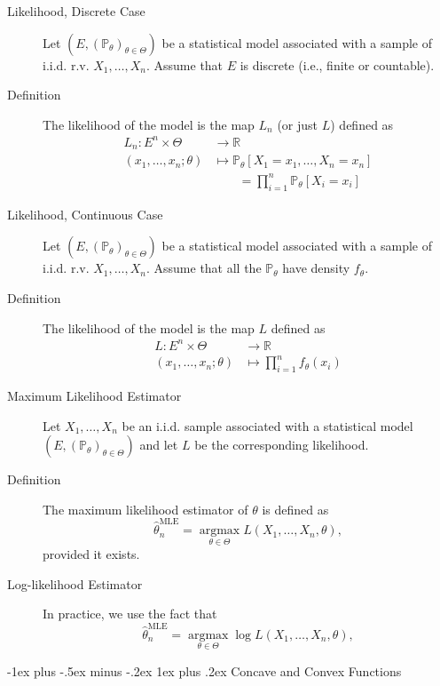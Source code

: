 \documentclass[a4paper, 10pt,landscape]{article}
\makeatletter
\DeclareMathOperator*{\argmax}{argmax}
\renewcommand{\subsubsection}{\@startsection{subsubsection}{3}{0mm}%
                                {-1ex plus -.5ex minus -.2ex}%
                                {1ex plus .2ex}%
                                {\normalfont\small\bfseries}}
\makeatother
\begin{document}
\begin{multicols*}{3}
\begin{description}
	\item[Likelihood, Discrete Case] Let $\left(E,\left(\mathbb{P}_\theta\right)_{\theta\in\Theta}\right)$ be a statistical model associated with a sample of i.i.d. r.v. $X_1,\dots,X_n$. Assume that $E$ is discrete (i.e., finite or countable).
	\item[Definition] The likelihood of the model is the map $L_n$ (or just $L$) defined as
	\begin{align*}
		L_n: E^n\times\Theta&\rightarrow\mathbb{R}\\
		(x_1,\dots,x_n;\theta)&\mapsto\mathbb{P}_\theta\left[X_1=x_1,\dots,X_n=x_n\right]\\
		&\qquad=\prod_{i=1}^{n}\mathbb{P}_\theta\left[X_i=x_i\right]
	\end{align*}
	\item[Likelihood, Continuous Case] Let $\left(E,\left(\mathbb{P}_\theta\right)_{\theta\in\Theta}\right)$ be a statistical model associated with a sample of i.i.d. r.v. $X_1,\dots,X_n$. Assume that all the $\mathbb{P}_\theta$ have density $f_\theta$.
	\item[Definition] The likelihood of the model is the map $L$ defined as
	\begin{align*}
	L: E^n\times\Theta&\rightarrow\mathbb{R}\\
	(x_1,\dots,x_n;\theta)&\mapsto\prod_{i=1}^{n}f_\theta(x_i)
	\end{align*}
	\item[Maximum Likelihood Estimator] Let $X_1,\dots,X_n$ be an i.i.d. sample associated with a statistical model $\left(E,\left(\mathbb{P}_\theta\right)_{\theta\in\Theta}\right)$ and let $L$ be the corresponding likelihood.
	\item[Definition] The maximum likelihood estimator of $\theta$ is defined as
	$$\hat{\theta}_n^\text{MLE}=\argmax\limits_{\theta\in\Theta}L\left(X_1,\dots,X_n,\theta\right),$$
	provided it exists.
	\item[Log-likelihood Estimator] In practice, we use the fact that
	$$\hat{\theta}_n^\text{MLE}=\argmax\limits_{\theta\in\Theta}\log L\left(X_1,\dots,X_n,\theta\right),$$
\end{description}

\subsubsection{Concave and Convex Functions}


\end{multicols*}
\end{document}
